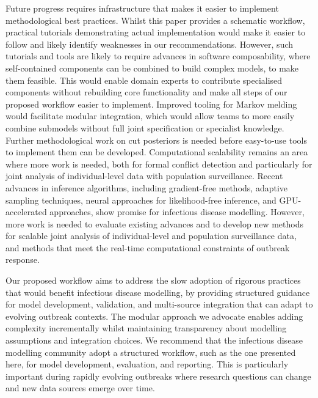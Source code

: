 \documentclass{article}
\begin{document}

Future progress requires infrastructure that makes it easier to implement methodological best practices.
Whilst this paper provides a schematic workflow, practical tutorials demonstrating actual implementation would make it easier to follow and likely identify weaknesses in our recommendations.
However, such tutorials and tools are likely to require advances in software composability, where self-contained components can be combined to build complex models, to make them feasible.
This would enable domain experts to contribute specialised components without rebuilding core functionality and make all steps of our proposed workflow easier to implement.
Improved tooling for Markov melding \citep{goudie2019joining} would facilitate modular integration, which would allow teams to more easily combine submodels without full joint specification or specialist knowledge. Further methodological work on cut posteriors \citep{liu2025general} is needed before easy-to-use tools to implement them can be developed.
Computational scalability remains an area where more work is needed, both for formal conflict detection \citep{yang2025detecting} and particularly for joint analysis of individual-level data with population surveillance.
Recent advances in inference algorithms, including gradient-free methods, adaptive sampling techniques, neural approaches for likelihood-free inference, and GPU-accelerated approaches, show promise for infectious disease modelling. However, more work is needed to evaluate existing advances and to develop new methods for scalable joint analysis of individual-level and population surveillance data, and methods that meet the real-time computational constraints of outbreak response.


Our proposed workflow aims to address the slow adoption of rigorous practices that would benefit infectious disease modelling, by providing structured guidance for model development, validation, and multi-source integration that can adapt to evolving outbreak contexts.
The modular approach we advocate enables adding complexity incrementally whilst maintaining transparency about modelling assumptions and integration choices.
We recommend that the infectious disease modelling community adopt a structured workflow, such as the one presented here, for model development, evaluation, and reporting. 
This is particularly important during rapidly evolving outbreaks where research questions can change and new data sources emerge over time.
\end{document}
